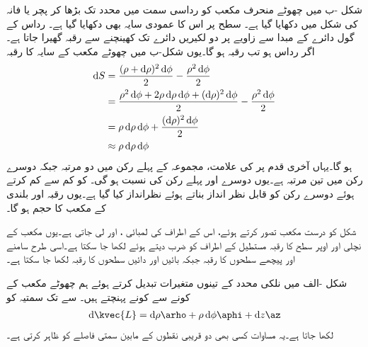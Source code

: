 شکل -ب میں چھوٹے منحرف مکعب کو رداسی سمت میں  محدد تک بڑھا کر پچر یا فانہ کی شکل میں دکھایا گیا ہے۔ سطح پر اس کا عمودی سایہ بھی دکھایا گیا ہے۔ رداس کے گول دائرے  کے مبدا سے   زاویے پر دو لکیریں دائرے تک کھینچنے سے   رقبہ گھیرا جاتا ہے۔اگر رداس  ہو تب رقبہ  ہو گا۔یوں شکل-ب میں چھوٹے مکعب کے سایہ  کا رقبہ 
\begin{align*}
\dif S&=\frac{(\rho+\dif \rho)^2 \dif \phi}{2} - \frac{\rho^2 \dif \phi}{2}\\
&=\frac{\rho^2 \dif \phi +2 \rho \dif \rho \dif \phi+(\dif \rho)^2 \dif \phi}{2}-\frac{\rho^2 \dif \phi}{2}\\
&=\rho \dif \rho \dif \phi+\frac{(\dif \rho)^2 \dif \phi}{2}\\
&\approx \rho \dif \rho \dif \phi
\end{align*}
ہو گا۔یہاں آخری قدم پر  کی علامت، مجموعہ کے پہلے رکن میں دو مرتبہ  جبکہ دوسرے رکن میں تین مرتبہ ہے۔یوں دوسرے اور پہلے رکن کی نسبت
   ہو گی۔ کو کم سے کم کرتے ہوئے دوسرے رکن کو قابل نظر انداز بناتے ہوئے نظرانداز کیا گیا ہے۔یوں  رقبہ اور  بلندی کے مکعب کا حجم  ہو گا۔

شکل  کو درست مکعب تصور کرتے ہوئے، اس کے اطراف کی لمبائی ،  اور  لی جاتی ہے۔یوں مکعب کے نچلی اور اوپر سطح کا رقبہ مستطیل کے اطراف کو ضرب دیتے ہوئے   لکھا جا سکتا ہے۔اسی طرح سامنے اور پیچھے سطحوں  کا رقبہ  جبکہ بائیں اور دائیں سطحوں کا رقبہ  لکھا جا سکتا ہے۔


شکل -الف میں نلکی محدد کے تینوں متغیرات تبدیل کرتے ہوئے ہم چھوٹے مکعب کے   کونے سے  کونے پہنچتے ہیں۔ سے  تک سمتیہ کو
\begin{align}\label{مساوات_سمتیہ_نلکی_چھوٹا_فاصلہ}
\dif \kvec{L}=\dif \rho \arho+\rho \dif \phi \aphi+\dif z \az
\end{align}
لکھا جاتا ہے۔یہ مساوات کسی بھی دو قریبی نقطوں کے مابین سمتی فاصلے کو ظاہر کرتی ہے۔

